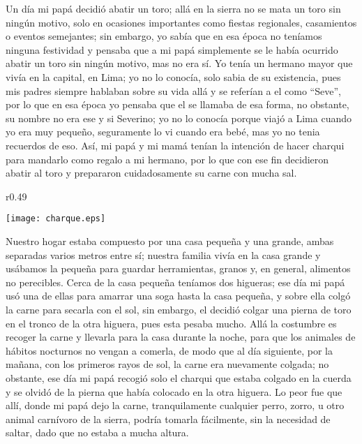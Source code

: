 Un día mi papá decidió abatir un toro; allá en la sierra no se mata un toro sin ningún motivo, solo en ocasiones importantes como fiestas regionales, casamientos o eventos semejantes; sin embargo, yo sabía que en esa época no teníamos ninguna festividad y pensaba que a mi papá simplemente se le había ocurrido abatir un toro sin ningún motivo, mas no era sí.
Yo tenía un hermano mayor que vivía en la capital, en Lima; yo no lo conocía, solo sabia de su existencia, pues mis padres siempre hablaban sobre su vida allá y se referían a el como ``Seve'', por lo que en esa época yo pensaba que el se llamaba de esa forma, no obstante, su nombre no era ese y si Severino; yo no lo conocía porque viajó a Lima cuando yo era muy pequeño, seguramente lo vi cuando era bebé, mas yo no tenia recuerdos de eso.
Así, mi papá y mi mamá tenían la intención de hacer charqui para mandarlo como regalo a mi hermano, por lo que con ese fin decidieron abatir al toro y prepararon cuidadosamente su carne con mucha sal.

\begin{wrapfigure}{r}{0.49\textwidth}
  \begin{center}
  \vspace{-20pt}
    \texttt{[image: charque.eps]}
  \end{center}
  \vspace{-20pt}
\end{wrapfigure}
Nuestro hogar estaba compuesto por una casa pequeña y una grande, ambas separadas varios metros entre sí; nuestra familia vivía en la casa grande y usábamos la pequeña para guardar herramientas, granos y, en general, alimentos no perecibles.
Cerca de la casa pequeña teníamos dos higueras; ese día mi papá usó una de ellas para amarrar una soga hasta la casa pequeña, y sobre ella colgó la carne para secarla con el sol, sin embargo, el decidió colgar una pierna de toro en el tronco de la otra higuera, pues esta pesaba mucho.
Allá la costumbre es recoger la carne y llevarla para la casa durante la noche, para que los animales de hábitos nocturnos no vengan a comerla, de modo que al día siguiente, por la mañana, con los primeros rayos de sol, la carne era nuevamente colgada; no obstante, ese día mi papá recogió solo el charqui que estaba colgado en la cuerda y se olvidó de la pierna que había colocado en la otra higuera.
Lo peor fue que allí, donde mi papá dejo la carne, tranquilamente cualquier perro, zorro, u otro animal carnívoro de la sierra, podría tomarla fácilmente, sin la necesidad de saltar, dado que no estaba a mucha altura.

